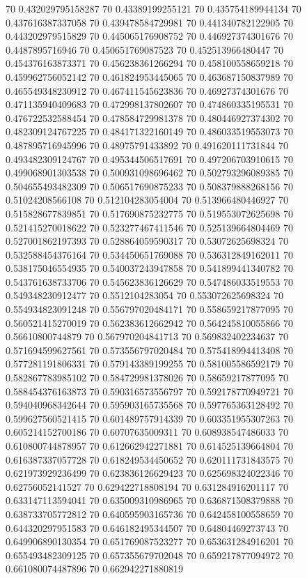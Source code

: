 {70 0.432029795158287
70 0.43389199255121
70 0.435754189944134
70 0.437616387337058
70 0.439478584729981
70 0.441340782122905
70 0.443202979515829
70 0.445065176908752
70 0.446927374301676
70 0.4487895716946
70 0.450651769087523
70 0.452513966480447
70 0.454376163873371
70 0.456238361266294
70 0.458100558659218
70 0.459962756052142
70 0.461824953445065
70 0.463687150837989
70 0.465549348230912
70 0.467411545623836
70 0.46927374301676
70 0.471135940409683
70 0.472998137802607
70 0.474860335195531
70 0.476722532588454
70 0.478584729981378
70 0.480446927374302
70 0.482309124767225
70 0.484171322160149
70 0.486033519553073
70 0.487895716945996
70 0.48975791433892
70 0.491620111731844
70 0.493482309124767
70 0.495344506517691
70 0.497206703910615
70 0.499068901303538
70 0.500931098696462
70 0.502793296089385
70 0.504655493482309
70 0.506517690875233
70 0.508379888268156
70 0.51024208566108
70 0.512104283054004
70 0.513966480446927
70 0.515828677839851
70 0.517690875232775
70 0.519553072625698
70 0.521415270018622
70 0.523277467411546
70 0.525139664804469
70 0.527001862197393
70 0.528864059590317
70 0.53072625698324
70 0.532588454376164
70 0.534450651769088
70 0.536312849162011
70 0.538175046554935
70 0.540037243947858
70 0.541899441340782
70 0.543761638733706
70 0.545623836126629
70 0.547486033519553
70 0.549348230912477
70 0.5512104283054
70 0.553072625698324
70 0.554934823091248
70 0.556797020484171
70 0.558659217877095
70 0.560521415270019
70 0.562383612662942
70 0.564245810055866
70 0.56610800744879
70 0.567970204841713
70 0.569832402234637
70 0.571694599627561
70 0.573556797020484
70 0.575418994413408
70 0.577281191806331
70 0.579143389199255
70 0.581005586592179
70 0.582867783985102
70 0.584729981378026
70 0.58659217877095
70 0.588454376163873
70 0.590316573556797
70 0.592178770949721
70 0.594040968342644
70 0.595903165735568
70 0.597765363128492
70 0.599627560521415
70 0.601489757914339
70 0.603351955307263
70 0.605214152700186
70 0.60707635009311
70 0.608938547486033
70 0.610800744878957
70 0.612662942271881
70 0.614525139664804
70 0.616387337057728
70 0.618249534450652
70 0.620111731843575
70 0.621973929236499
70 0.623836126629423
70 0.625698324022346
70 0.62756052141527
70 0.629422718808194
70 0.631284916201117
70 0.633147113594041
70 0.635009310986965
70 0.636871508379888
70 0.638733705772812
70 0.640595903165736
70 0.642458100558659
70 0.644320297951583
70 0.646182495344507
70 0.64804469273743
70 0.649906890130354
70 0.651769087523277
70 0.653631284916201
70 0.655493482309125
70 0.657355679702048
70 0.659217877094972
70 0.661080074487896
70 0.662942271880819
}
